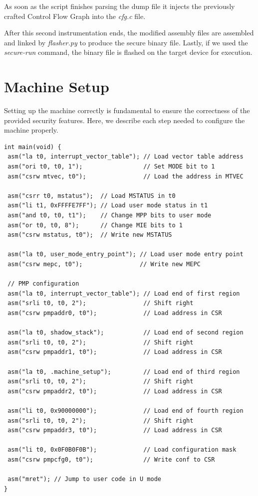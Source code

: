 As soon as the script finishes parsing the dump file it injects the previously
crafted Control Flow Graph into the \textit{cfg.c} file.

After this second instrumentation ends, the modified assembly files are
assembled and linked by \textit{flasher.py} to produce the secure binary file.
Lastly, if we used the \textit{secure-run} command, the binary file is flashed on
the target device for execution.

\section{Machine Setup}
\label{sec:project_setup}

Setting up the machine correctly is fundamental to ensure the correctness of the
provided security features. Here, we describe each step needed to configure the
machine properly. \\ \begin{lstlisting}[style=CStyle, caption = Machine setup, label={lst:setup}]
int main(void) {
 asm("la t0, interrupt_vector_table"); // Load vector table address
 asm("ori t0, t0, 1");                 // Set MODE bit to 1
 asm("csrw mtvec, t0");                // Load the address in MTVEC

 asm("csrr t0, mstatus");  // Load MSTATUS in t0
 asm("li t1, 0xFFFFE7FF"); // Load user mode status in t1
 asm("and t0, t0, t1");    // Change MPP bits to user mode
 asm("or t0, t0, 8");      // Change MIE bits to 1
 asm("csrw mstatus, t0");  // Write new MSTATUS

 asm("la t0, user_mode_entry_point"); // Load user mode entry point
 asm("csrw mepc, t0");                // Write new MEPC

 // PMP configuration
 asm("la t0, interrupt_vector_table"); // Load end of first region
 asm("srli t0, t0, 2");                // Shift right
 asm("csrw pmpaddr0, t0");             // Load address in CSR

 asm("la t0, shadow_stack");           // Load end of second region
 asm("srli t0, t0, 2");                // Shift right
 asm("csrw pmpaddr1, t0");             // Load address in CSR

 asm("la t0, .machine_setup");         // Load end of third region
 asm("srli t0, t0, 2");                // Shift right
 asm("csrw pmpaddr2, t0");             // Load address in CSR

 asm("li t0, 0x90000000");             // Load end of fourth region
 asm("srli t0, t0, 2");                // Shift right
 asm("csrw pmpaddr3, t0");             // Load address in CSR

 asm("li t0, 0x0F0B0F0B");             // Load configuration mask
 asm("csrw pmpcfg0, t0");              // Write conf to CSR

 asm("mret"); // Jump to user code in U mode
}
\end{lstlisting}

